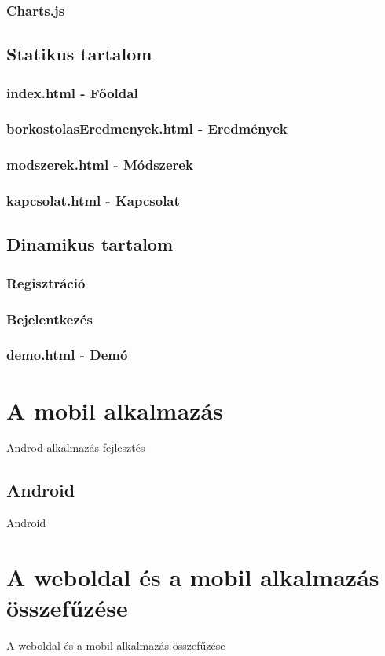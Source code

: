 \documentclass[12pt]{report}
\theoremstyle{definition}
\begin{document}
\subsection{Charts.js}

\section{Statikus tartalom}
\subsection{index.html - Főoldal}
\subsection{borkostolasEredmenyek.html - Eredmények}
\subsection{modszerek.html - Módszerek}
\subsection{kapcsolat.html - Kapcsolat}

\section{Dinamikus tartalom}
\subsection{Regisztráció}
\subsection{Bejelentkezés}
\subsection{demo.html - Demó}

\chapter{A mobil alkalmazás}
Androd alkalmazás fejlesztés

\section{Android}
Android

\chapter{A weboldal és a mobil alkalmazás összefűzése}
A weboldal és a mobil alkalmazás összefűzése
\end{document}
